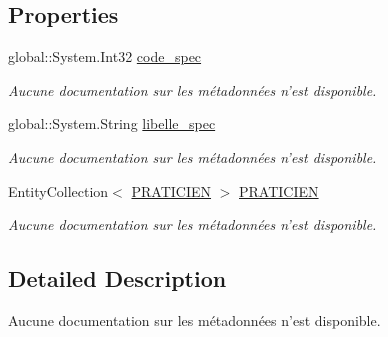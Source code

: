 \subsection*{Properties}
\begin{DoxyCompactItemize}
\item 
global\-::\-System.\-Int32 \hyperlink{class_model_1_1_s_p_e_c_i_a_l_i_t_e_a3f2f2a136e0e517600c23a5ebb9d9cac}{code\-\_\-spec}
\begin{DoxyCompactList}\small\item\em Aucune documentation sur les métadonnées n'est disponible. \end{DoxyCompactList}\item 
global\-::\-System.\-String \hyperlink{class_model_1_1_s_p_e_c_i_a_l_i_t_e_a82916a9c724d347181c4e30fba74c3ff}{libelle\-\_\-spec}
\begin{DoxyCompactList}\small\item\em Aucune documentation sur les métadonnées n'est disponible. \end{DoxyCompactList}\item 
Entity\-Collection$<$ \hyperlink{class_model_1_1_p_r_a_t_i_c_i_e_n}{P\-R\-A\-T\-I\-C\-I\-E\-N} $>$ \hyperlink{class_model_1_1_s_p_e_c_i_a_l_i_t_e_ab96edcc3579c95087e878fdeff929e00}{P\-R\-A\-T\-I\-C\-I\-E\-N}
\begin{DoxyCompactList}\small\item\em Aucune documentation sur les métadonnées n'est disponible. \end{DoxyCompactList}\end{DoxyCompactItemize}


\subsection{Detailed Description}
Aucune documentation sur les métadonnées n'est disponible. 



